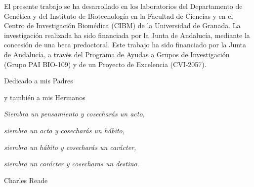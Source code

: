 \documentclass[b5paper,twoside,10pt]{book}
\begin{document}
{\rule{0pt}{85ex} El presente trabajo se ha desarrollado en los laboratorios del Departamento de Gen\'etica y del Instituto de Biotecnolog\'ia en la Facultad de Ciencias y en el Centro de Investigaci\'on Biom\'edica (CIBM) de la Universidad de Granada. La investigaci\'on realizada ha sido financiada por la Junta de Andalucía, mediante la concesi\'on de una beca predoctoral. Este trabajo ha sido financiado por la Junta de Andalucía, a través del Programa de Ayudas a Grupos de Investigación (Grupo PAI BIO-109) y de un Proyecto de Excelencia (CVI-2057).
 
 
\newpage
\cleardoublepage

\newpage
\cleardoublepage
\null{}
{
\begin{flushright}
 Dedicado a mis Padres 

y también a mis Hermanos
\end{flushright}
}
\newpage
\cleardoublepage




\null{}
{
\hfill \begin{minipage}{8cm}
\textsl{Siembra un pensamiento y cosecharás un acto,}

\textsl{siembra un acto y cosecharás un hábito,}

\textsl{siembra un hábito y cosecharás un carácter,}

\textsl{siembra un carácter y cosecharas un destino. }

\begin{flushright}
Charles Reade  
\end{flushright}

\end{minipage}
}
\newpage
\cleardoublepage






\dominitoc
\dominilof
\dominilot
\tableofcontents
\listoffigures
\listoftables
\clearpage


%
%
\pagestyle{fancy}


\mainmatter



\pagestyle{fancy}
\lhead{\nouppercase{\bfseries{\leftmark}}}
\rhead{\nouppercase{\bfseries{\rightmark}}}
\fancyhead[LO]{\bfseries{}}
\fancyhead[RE]{\bfseries{}}
\cfoot{\thepage}
\renewcommand{\headrulewidth}{0.5pt}
}
\end{document}
